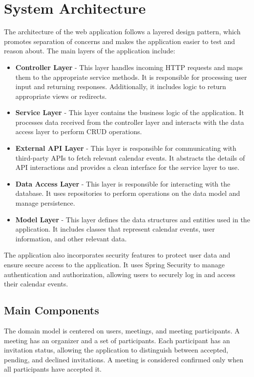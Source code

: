 \chapter{System Architecture} \label{cap:arch}

The architecture of the web application follows a layered design pattern, which promotes separation of concerns and makes the application easier to test and reason about. The main layers of the application include:

\begin{itemize}
    \item \textbf{Controller Layer} - This layer handles incoming HTTP requests and maps them to the appropriate service methods. It is responsible for processing user input and returning responses. Additionally, it includes logic to return appropriate views or redirects.
    \item \textbf{Service Layer} - This layer contains the business logic of the application. It processes data received from the controller layer and interacts with the data access layer to perform CRUD operations.
    \item \textbf{External API Layer} - This layer is responsible for communicating with third-party APIs to fetch relevant calendar events. It abstracts the details of API interactions and provides a clean interface for the service layer to use.
    \item \textbf{Data Access Layer} - This layer is responsible for interacting with the database. It uses repositories to perform operations on the data model and manage persistence.
    \item \textbf{Model Layer} - This layer defines the data structures and entities used in the application. It includes classes that represent calendar events, user information, and other relevant data.
\end{itemize}

The application also incorporates security features to protect user data and ensure secure access to the application. It uses Spring Security to manage authentication and authorization, allowing users to securely log in and access their calendar events.

\section{Main Components}

The domain model is centered on users, meetings, and meeting participants. A meeting has an organizer and a set of participants. Each participant has an invitation status, allowing the application to distinguish between accepted, pending, and declined invitations. A meeting is considered confirmed only when all participants have accepted it.


